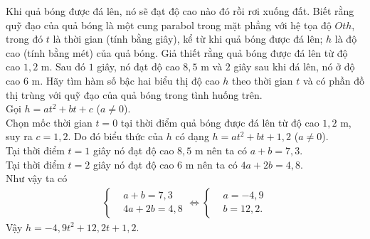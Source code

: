 \begin{vd}%
	Khi quả bóng được đá lên, nó sẽ đạt độ cao nào đó rồi rơi xuống đất. Biết rằng quỹ đạo của quả bóng là một cung parabol trong mặt phẳng với hệ tọa độ $Oth$, trong đó $t$ là thời gian (tính bằng giây), kể từ khi quả bóng được đá lên; $h$ là độ cao (tính bằng mét) của quả bóng. Giả thiết rằng quả bóng được đá lên từ độ cao $1{,}2$ m. Sau đó $1$ giây, nó đạt độ cao $8{,}5$ m và $2$ giây sau khi đá lên, nó ở độ cao $6$ m. Hãy tìm hàm số bậc hai biểu thị độ cao $h$ theo thời gian $t$ và có phần đồ thị trùng với quỹ đạo của quả bóng trong tình huống trên.\\
	\hspace*{2cm} 
	\loigiai
	{
		Gọi $h=at^2+bt+c$ ($a\neq 0$).\\
		Chọn mốc thời gian $t=0$ tại thời điểm quả bóng được đá lên từ độ cao $1{,}2$ m, suy ra $c=1{,}2$. Do đó biểu thức của $h$ có dạng $h=at^2+bt+1{,}2$ ($a\neq 0$).\\
		Tại thời điểm $t=1$ giây nó đạt độ cao $8{,}5$ m nên ta có $a+b=7{,}3$.\\
		Tại thời điểm $t=2$ giây nó đạt độ cao $6$ m nên ta có $4a+2b=4{,}8$.\\
		Như vậy ta có
		\begin{eqnarray*}
			\left\{\begin{aligned}&a+b=7{,}3 \\&4a+2b=4{,}8\end{aligned}\right. \Leftrightarrow \left\{\begin{aligned}&a=-4{,}9 \\&b=12{,}2.  \end{aligned}\right.
		\end{eqnarray*}
		Vậy $h=-4{,}9t^2 + 12{,}2t + 1{,}2$.
	}
\end{vd} 

